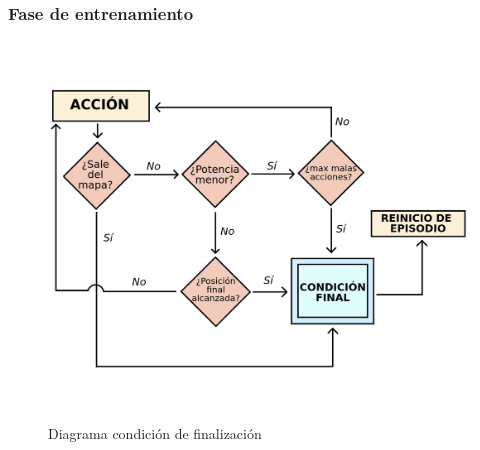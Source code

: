 \subsubsection{Fase de entrenamiento}
\label{subsubsec:train}

\begin{figure} [tp]
    \begin{center}
    \includegraphics[height=10cm]{imagenes/cap4/11_diagrama_training.png}
    \end{center}
    \caption[Diagrama condición de finalización]{Diagrama condición de finalización}
    \label{fig:training_phase}
\end{figure}

